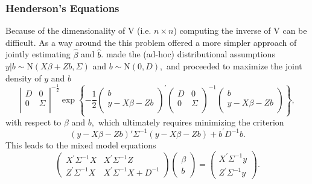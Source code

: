 \documentclass[12pt, a4paper]{report}
\theoremstyle{plain}
\theoremstyle{definition}
\theoremstyle{remark}
\begin{document}
\subsubsection{Henderson's Equations}
Because of the dimensionality of V (i.e. $n \times n$) computing the inverse of V can be difficult. As a way around the this problem \citet{Henderson53, Henderson59,Henderson63,Henderson73,Henderson84a} offered a more simpler approach of jointly estimating $\hat{\beta}$ and $\hat{b}$.
\cite{Henderson:1950} made the (ad-hoc) distributional assumptions $y|b \sim \mathrm{N} (X \beta + Zb, \Sigma)$ and $b \sim \mathrm{N}(0,D),$ and proceeded to maximize the joint density of $y$ and $b$
		\begin{equation}
		\left|
		\begin{array}{cc}
		D & 0 \\
		0 & \Sigma \\
		\end{array}
		\right|^{-\frac{1}{2}}
		\exp
		\left\{ -\frac{1}{2}
		\left(
		\begin{array}{c}
		b \\
		y - X \beta -Zb \\
		\end{array}
		\right)^\prime
		\left( \begin{array}{cc}
		D & 0 \\
		0 & \Sigma \\
		\end{array}\right)^{-1}
		\left(
		\begin{array}{c}
		b \\
		y - X \beta -Zb \\
		\end{array}
		\right)
		\right\},
		\label{u&beta:JointDensity}
		\end{equation}
		with respect to $\beta$ and $b,$ which ultimately requires minimizing the criterion
		\begin{equation}
		(y - X \beta -Zb)'\Sigma^{-1}(y - X \beta -Zb) + b^\prime D^{-1}b.
		\label{Henderson:Criterion}
		\end{equation}
		This leads to the mixed model equations
		\begin{equation}
		\left(\begin{array}{cc}
		X^\prime\Sigma^{-1}X & X^\prime\Sigma^{-1}Z
		\\
		Z^\prime\Sigma^{-1}X & X^\prime\Sigma^{-1}X + D^{-1}
		\end{array}\right)
		\left(\begin{array}{c}
		\beta \\
		b
		\end{array}\right)
		=
		\left(\begin{array}{c}
		X^\prime\Sigma^{-1}y \\
		Z^\prime\Sigma^{-1}y
		\end{array}\right).
		\label{Henderson:Equations}
		\end{equation}
\end{document}
